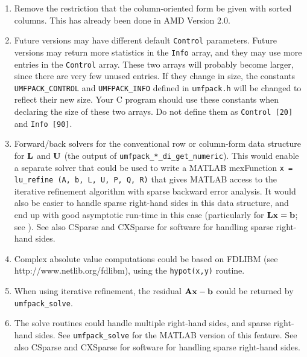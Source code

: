 \documentclass[11pt]{article}
\newcommand{\m}[1]{{\bf{#1}}}       %
\begin{document}
\begin{enumerate}

\item Remove the restriction that the column-oriented form be given with
    sorted columns.  This has already been done in AMD Version 2.0.

\item Future versions may have different default {\tt Control} parameters.
    Future versions may return more statistics in the {\tt Info} array, and
    they may use more entries in the {\tt Control} array.
    These two arrays will probably become larger, since there are very few
    unused entries.  If they change in size, the constants
    {\tt UMFPACK\_CONTROL} and {\tt UMFPACK\_INFO} defined in {\tt umfpack.h}
    will be changed to reflect their new size.  Your C program should use
    these constants when declaring the size of these two arrays.  Do not
    define them as {\tt Control [20]} and {\tt Info [90]}.

\item Forward/back solvers for the conventional row or column-form data
    structure for $\m{L}$ and $\m{U}$ (the output of
    {\tt umfpack\_*\_di\_get\_numeric}).  This would enable a separate
    solver that could be used to write a MATLAB mexFunction
    {\tt x = lu\_refine (A, b, L, U, P, Q, R)} that gives MATLAB access
    to the iterative refinement algorithm with sparse backward error
    analysis.  It would also be easier to handle sparse right-hand sides
    in this data structure, and end up with good asymptotic run-time
    in this case
    (particularly for $\m{Lx}=\m{b}$; see \cite{GilbertPeierls88}).
    See also CSparse and 
    CXSparse for software for handling sparse right-hand sides.

\item Complex absolute value computations could be
    based on FDLIBM (see \newline
    http://www.netlib.org/fdlibm),
    using the {\tt hypot(x,y)} routine.

\item When using iterative refinement, the residual $\m{Ax}-\m{b}$ could be
    returned by {\tt umfpack\_solve}.

\item The solve routines could handle multiple right-hand sides, and sparse
    right-hand sides.  See {\tt umfpack\_solve} for the MATLAB version
    of this feature.
    See also CSparse and 
    CXSparse for software for handling sparse right-hand sides.


\end{enumerate}
\end{document}
